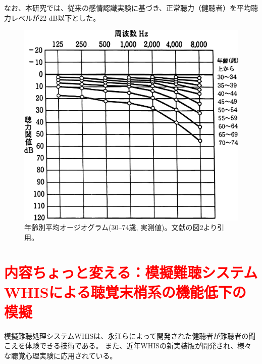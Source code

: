 なお、本研究では、従来の感情認識実験\cite{christensen2019effects}に基づき、正常聴力（健聴者）を平均聴力レベルが22 dB以下とした。
\begin{figure}[h]
    \centering
    \includegraphics[width=0.6\hsize]{Figure/RelatedResearch/Tsuiki2003Audiogram.eps}
    \caption{年齢別平均オージオグラム(30--74歳, 実測値)。文献\cite{tuiki2003eldery}の図2より引用。}
    \label{fig:Audiogram}
\end{figure}



\section{\textcolor{red}{内容ちょっと変える：模擬難聴システムWHISによる聴覚末梢系の機能低下の模擬}}
\label{sec:WHIS}

模擬難聴処理システムWHISは、永江らによって開発された健聴者が難聴者の聞こえを体験できる技術である\cite{nagae2016WHIS}。
また、近年WHISの新実装版が開発され\cite{irino2023hearing}、様々な聴覚心理実験に応用されている。



